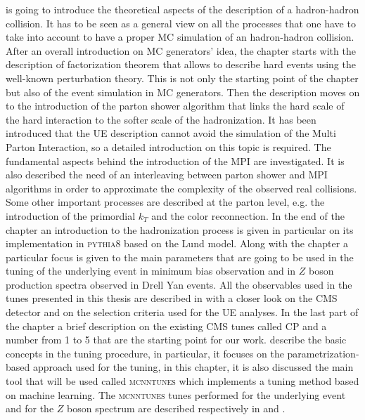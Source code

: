 \medskip

 is going to introduce the theoretical aspects of the description of a hadron-hadron collision. It has to be seen as a general view on all the processes that one have to take into account to have a proper MC simulation of an hadron-hadron collision. After an overall introduction on MC generators' idea, the chapter starts with the description of factorization theorem that allows to describe hard events using the well-known perturbation theory. This is not only the starting point of the chapter but also of the event simulation in MC generators. Then the description moves on to the introduction of the parton shower algorithm that links the hard scale of the hard interaction to the softer scale of the hadronization. It has been introduced that the UE description cannot avoid the simulation of the Multi Parton Interaction, so a detailed introduction on this topic is required. The fundamental aspects behind the introduction of the MPI are investigated. It is also described the need of an interleaving between parton shower and MPI algorithms in order to approximate the complexity of the observed real collisions.  Some other important processes are described at the parton level, e.g. the introduction of the primordial $k_T$ and the color reconnection. In the end of the chapter an introduction to the hadronization process is given in particular on its implementation in \textsc{pythia8} based on the Lund model. 
Along with the chapter a particular focus is given to the main parameters that are going to be used in the tuning of the underlying event in minimum bias observation and in $Z$ boson production spectra observed in Drell Yan events. All the observables used in the tunes presented in this thesis are described in  with a closer look on the CMS detector and on the selection criteria used for the UE analyses. In the last part of the chapter a brief description on the existing CMS tunes called CP and a number from 1 to 5 \cite{CPtunes} that are the starting point for our work.  describe the basic concepts in the tuning procedure, in particular, it focuses on the parametrization-based approach used for the tuning, in this chapter, it is also discussed the main tool that will be used called \textsc{mcnntunes} \cite{MCNNTUNESarticle} which implements a tuning method based on machine learning. The \textsc{mcnntunes} tunes performed for the underlying event and for the $Z$ boson spectrum are described respectively in  and .
 